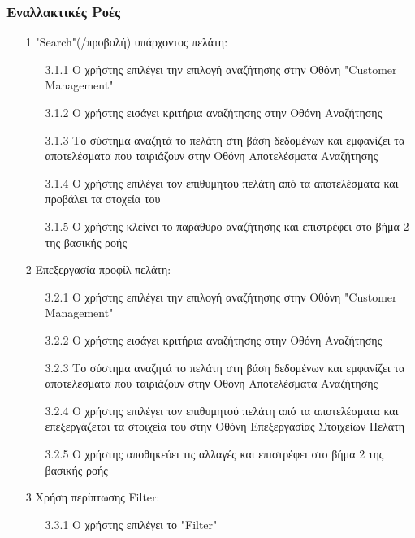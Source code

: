 \documentclass[12pt,a4paper,twoside]{book}
\begin{document}
\subsubsection{Εναλλακτικές Ροές}
\begin{enumerate}
  \item[1 ] "Search"(/προβολή) υπάρχοντος πελάτη: %
        \begin{enumerate}
          \item[3.1.1 ] Ο χρήστης επιλέγει την επιλογή αναζήτησης στην Οθόνη "Customer Management" %
          \item[3.1.2 ] Ο χρήστης εισάγει κριτήρια αναζήτησης στην Οθόνη Αναζήτησης %
          \item[3.1.3 ] Το σύστημα αναζητά το πελάτη στη βάση δεδομένων και εμφανίζει τα αποτελέσματα που ταιριάζουν στην Οθόνη Αποτελέσματα Αναζήτησης %
          \item[3.1.4 ] Ο χρήστης επιλέγει τον επιθυμητού πελάτη από τα αποτελέσματα και προβάλει τα στοχεία του
          \item[3.1.5 ] Ο χρήστης κλείνει το παράθυρο αναζήτησης και επιστρέφει στο βήμα 2 της βασικής ροής
        \end{enumerate}
  \item[2 ] Επεξεργασία προφίλ πελάτη:
        \begin{enumerate}
          \item[3.2.1 ] Ο χρήστης επιλέγει την επιλογή αναζήτησης στην Οθόνη "Customer Management" %
          \item[3.2.2 ] Ο χρήστης εισάγει κριτήρια αναζήτησης στην Οθόνη Αναζήτησης %
          \item[3.2.3 ] Το σύστημα αναζητά το πελάτη στη βάση δεδομένων και εμφανίζει τα αποτελέσματα που ταιριάζουν στην Οθόνη Αποτελέσματα Αναζήτησης %
          \item[3.2.4 ] Ο χρήστης επιλέγει τον επιθυμητού πελάτη από τα αποτελέσματα και επεξεργάζεται τα στοιχεία του στην Οθόνη Επεξεργασίας Στοιχείων Πελάτη %
          \item[3.2.5 ] Ο χρήστης αποθηκεύει τις αλλαγές και επιστρέφει στο βήμα 2 της βασικής ροής
        \end{enumerate}
  \item[3 ] Χρήση περίπτωσης Filter:
        \begin{enumerate}
          \item[3.3.1 ] Ο χρήστης επιλέγει το "Filter"  %

\end{enumerate}
\end{enumerate}
\end{document}
